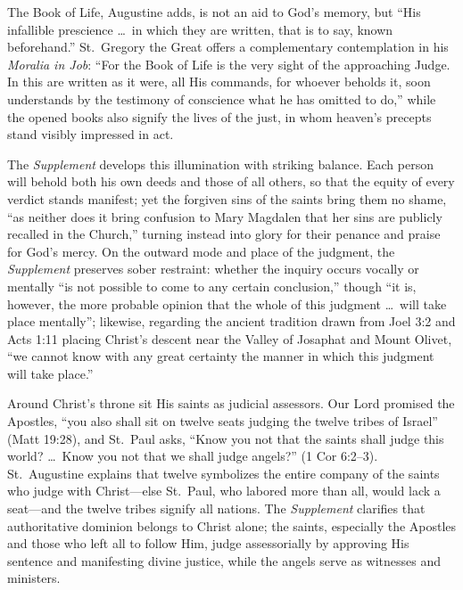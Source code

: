 The Book of Life, Augustine adds, is not an aid to God's memory, but ``His infallible prescience \dots\ in which they are written, that is to say, known beforehand.'' St.\ Gregory the Great offers a complementary contemplation in his \textit{Moralia in Job}: ``For the Book of Life is the very sight of the approaching Judge. In this are written as it were, all His commands, for whoever beholds it, soon understands by the testimony of conscience what he has omitted to do,'' while the opened books also signify the lives of the just, in whom heaven's precepts stand visibly impressed in act.

The \textit{Supplement} develops this illumination with striking balance. Each person will behold both his own deeds and those of all others, so that the equity of every verdict stands manifest; yet the forgiven sins of the saints bring them no shame, ``as neither does it bring confusion to Mary Magdalen that her sins are publicly recalled in the Church,'' turning instead into glory for their penance and praise for God's mercy. On the outward mode and place of the judgment, the \textit{Supplement} preserves sober restraint: whether the inquiry occurs vocally or mentally ``is not possible to come to any certain conclusion,'' though ``it is, however, the more probable opinion that the whole of this judgment \dots\ will take place mentally''; likewise, regarding the ancient tradition drawn from Joel 3:2 and Acts 1:11 placing Christ's descent near the Valley of Josaphat and Mount Olivet, ``we cannot know with any great certainty the manner in which this judgment will take place.''

Around Christ's throne sit His saints as judicial assessors. Our Lord promised the Apostles, ``you also shall sit on twelve seats judging the twelve tribes of Israel'' (Matt 19:28), and St.\ Paul asks, ``Know you not that the saints shall judge this world? \dots\ Know you not that we shall judge angels?'' (1 Cor 6:2--3). St.\ Augustine explains that twelve symbolizes the entire company of the saints who judge with Christ---else St.\ Paul, who labored more than all, would lack a seat---and the twelve tribes signify all nations. The \textit{Supplement} clarifies that authoritative dominion belongs to Christ alone; the saints, especially the Apostles and those who left all to follow Him, judge assessorially by approving His sentence and manifesting divine justice, while the angels serve as witnesses and ministers.

